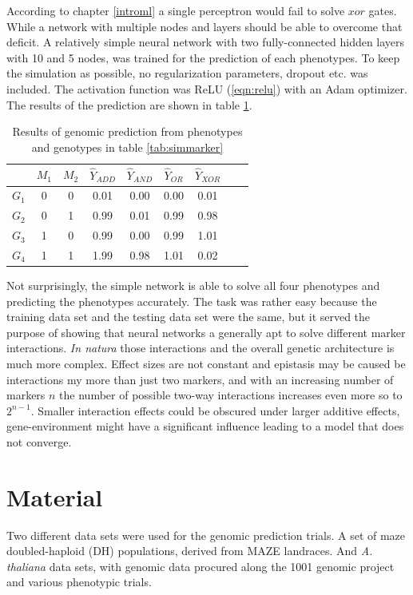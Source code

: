 According to chapter \ref{introml} a single perceptron would fail to solve $xor$ gates. While a network with
multiple nodes and layers should be able to overcome that deficit. A relatively simple neural network with two
fully-connected hidden layers with 10 and 5 nodes, was trained for the prediction of each phenotypes. To keep
the simulation as possible, no regularization parameters, dropout etc. was included. The activation function
was ReLU (\ref{eqn:relu}) with an Adam optimizer. The results of the prediction are shown in table
\ref{tab:simgpres}.

\begin{table}[H]
\caption{Results of genomic prediction from phenotypes and genotypes in table \ref{tab:simmarker}}
\label{tab:simgpres}
\centering
\begin{tabular}{ l c c | c c c c c c }
  \toprule
  & $M_1$ & $M_2$ & $\hat{Y}_{ADD}$ & $\hat{Y}_{AND}$ & $\hat{Y}_{OR}$ & $\hat{Y}_{XOR}$\\
  \midrule
  \hline 
  $G_1$ & 0 & 0 & 0.01 & 0.00 & 0.00 & 0.01 \\
  $G_2$ & 0 & 1 & 0.99 & 0.01 & 0.99 & 0.98 \\
  $G_3$ & 1 & 0 & 0.99 & 0.00 & 0.99 & 1.01 \\
  $G_4$ & 1 & 1 & 1.99 & 0.98 & 1.01 & 0.02 \\
  \bottomrule
\end{tabular}
\end{table}


Not surprisingly, the simple network is able to solve all four phenotypes and predicting the phenotypes
accurately. The task was rather easy because the training data set and the testing data set were the same, but
it served the purpose of showing that neural networks a generally apt to solve different marker
interactions. \textit{In natura} those interactions and the overall genetic architecture is much more
complex. Effect sizes are not constant and epistasis may be caused be interactions my more than just two
markers, and with an increasing number of markers $n$ the number of possible two-way interactions increases
even more so to $2^{n-1}$. Smaller interaction effects could be obscured under larger additive effects,
gene-environment might have a significant influence leading to a model that does not converge.


\section{Material}
Two different data sets were used for the genomic prediction trials.
A set of maze doubled-haploid (DH) populations, derived from MAZE landraces. And \textit{A. thaliana} data sets, with genomic data procured along the 1001 genomic project \cite{1001genome} and various phenotypic trials.


